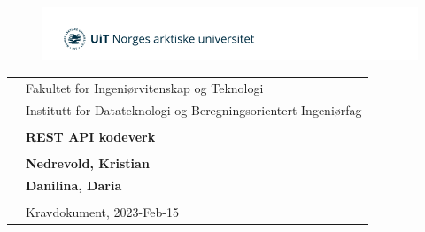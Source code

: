 \begin{center}

\begin{figure}[ht]
\centering
\includegraphics{images/uit-logo.png}
\end{figure}

\hfill \break
\begin{tabular}{ll}
     &Fakultet for Ingeniørvitenskap og Teknologi \\
     &Institutt for Datateknologi og Beregningsorientert Ingeniørfag \\
     \hfill \break\\
     &\large{\textbf{REST API kodeverk}} \\     
     \hfill \break \\   
     &\textbf{Nedrevold, Kristian} \\
     &\textbf{Danilina, Daria} \\
     \hfill \break\\
     &Kravdokument, 2023-Feb-15 \\
\end{tabular}

\thispagestyle{empty} 

\end{center}
